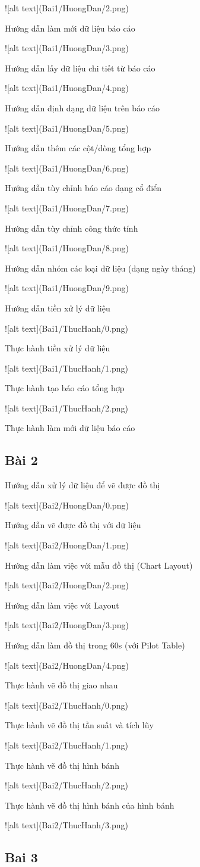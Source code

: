 \documentclass{article}
\begin{document}
![alt text](Bai1/HuongDan/2.png)
\caption{Hướng dẫn làm mới dữ liệu báo cáo}
![alt text](Bai1/HuongDan/3.png)
\caption{Hướng dẫn lấy dữ liệu chi tiết từ báo cáo}
![alt text](Bai1/HuongDan/4.png)
\caption{Hướng dẫn định dạng dữ liệu trên báo cáo}
![alt text](Bai1/HuongDan/5.png)
\caption{Hướng dẫn thêm các cột/dòng tổng hợp}
![alt text](Bai1/HuongDan/6.png)
\caption{Hướng dẫn tùy chỉnh báo cáo dạng cổ điển}
![alt text](Bai1/HuongDan/7.png)
\caption{Hướng dẫn tùy chỉnh công thức tính}
![alt text](Bai1/HuongDan/8.png)
\caption{Hướng dẫn nhóm các loại dữ liệu (dạng ngày tháng)}
![alt text](Bai1/HuongDan/9.png)
\caption{Hướng dẫn tiền xử lý dữ liệu}

![alt text](Bai1/ThucHanh/0.png)
\caption{Thực hành tiền xử lý dữ liệu}
![alt text](Bai1/ThucHanh/1.png)
\caption{Thực hành tạo báo cáo tổng hợp}
![alt text](Bai1/ThucHanh/2.png)
\caption{Thực hành làm mới dữ liệu báo cáo}
\subsection{Bài 2}

\caption{Hướng dẫn xử lý dữ liệu để vẽ được đồ thị }
![alt text](Bai2/HuongDan/0.png)

\caption{Hướng dẫn vẽ được đồ thị với dữ liệu}
![alt text](Bai2/HuongDan/1.png)

\caption{Hướng dẫn làm việc với mẫu đồ thị (Chart Layout)}
![alt text](Bai2/HuongDan/2.png)

\caption{Hướng dẫn làm việc với Layout}
![alt text](Bai2/HuongDan/3.png)

\caption{Hướng dẫn làm đồ thị trong 60s (với Pilot Table)}
![alt text](Bai2/HuongDan/4.png)


\caption{Thực hành vẽ đồ thị giao nhau}
![alt text](Bai2/ThucHanh/0.png)
\caption{Thực hành vẽ đồ thị tần suất và tích lũy}
![alt text](Bai2/ThucHanh/1.png)
\caption{Thực hành vẽ đồ thị hình bánh}
![alt text](Bai2/ThucHanh/2.png)
\caption{Thực hành vẽ đồ thị hình bánh của hình bánh}
![alt text](Bai2/ThucHanh/3.png)
\subsection{Bai 3}

\end{document}
